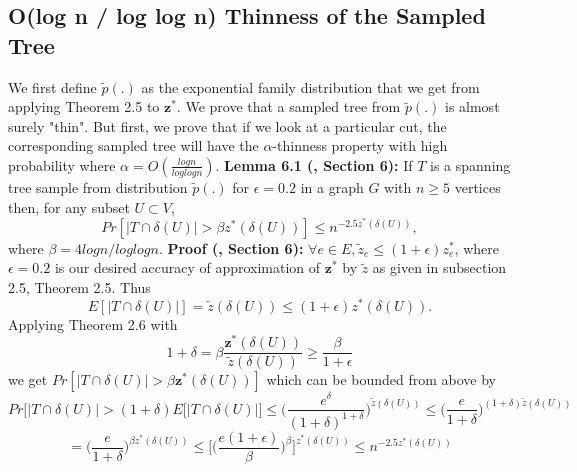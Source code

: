 \documentclass[oneside]{projectpaper} %
\begin{document}
\subsection{O(log n / log log n) Thinness of the Sampled Tree}
We first define $\tilde{p}(.)$ as the exponential family distribution that we get from applying Theorem 2.5 to $\textbf{z}^*$. We prove that a sampled tree from $\tilde{p}(.)$ is almost surely "thin". But first, we prove that if we look at a particular cut, the corresponding sampled tree will have the $\alpha$-thinness property with high probability where $\alpha = O(\frac{logn}{loglogn})$.
\newline
\newline
\textbf{Lemma 6.1 (\cite{AGM10}, Section 6):} If $T$ is a spanning tree sample from distribution $\tilde{p}(.)$ for $\epsilon = 0.2$ in a graph $G$ with $n \geq 5$ vertices then, for any subset $U \subset V$,
\begin{equation*}
Pr[|T \cap \delta(U)| > \beta z^*(\delta(U))] \leq n^{-2.5z^*(\delta(U))},
\end{equation*}
where $\beta = 4 logn / loglogn$.
\newline
\newline
\textbf{Proof (\cite{AGM10}, Section 6):} $\forall e \in E, \tilde{z}_e \leq (1 + \epsilon)z_{e}^{*}$, where $\epsilon = 0.2$ is our desired accuracy of approximation of $\textbf{z}^*$ by $\tilde{z}$ as given in subsection 2.5, Theorem 2.5. Thus
\begin{equation*}
E[|T \cap \delta(U)|] = \tilde{z}(\delta(U)) \leq (1 + \epsilon)z^*(\delta(U)).
\end{equation*}
Applying Theorem 2.6 with
\begin{equation*}
1 + \delta = \beta \frac{\textbf{z}^*(\delta(U))}{\tilde{z}(\delta(U))} \geq \frac{\beta}{1 + \epsilon}
\end{equation*}
we get $Pr[|T \cap \delta(U)| > \beta \textbf{z}^*(\delta(U))]$ which can be bounded from above by
\begin{equation*}
Pr\Big[|T \cap \delta(U)| > (1 + \delta)E[|T \cap \delta(U)|\Big] \leq \bigg(\frac{e^{\delta}}{(1 + \delta)^{1 + \delta}}\bigg)^{\tilde{z}(\delta(U))} \leq \bigg(\frac{e}{1 + \delta}\bigg)^{(1 + \delta)\tilde{z}(\delta(U))}
\end{equation*}
\begin{equation*}
= \bigg(\frac{e}{1 + \delta}\bigg)^{\beta z^*(\delta(U))} \leq \Bigg[\bigg(\frac{e(1 + \epsilon)}{\beta}\bigg)^\beta\Bigg]^{z^*(\delta(U))} \leq n^{-2.5z^*(\delta(U))}
\end{equation*}
\end{document}
